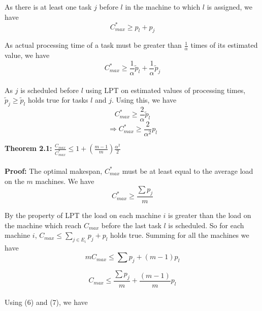 \documentclass[10pt, conference, compsocconf]{IEEEtran}
\begin{document}
As there is at least one task $j$ before $l$ in the machine to which $l$ is
assigned, we have
\begin{equation}\nonumber
C_{max}^{*}\geq p_l + p_j
\end{equation}



As actual processing time of a task must be greater than $\frac{1}{\alpha}$ times of its estimated value, we have
\begin{equation}\nonumber 
C_{max}^{*} \geq \frac{1}{\alpha}\tilde p_l +  \frac{1}{\alpha} \tilde p_j 
\end{equation}
\\
As $j$ is scheduled before $l$ using LPT on estimated values of processing times,  $\tilde p_j\geq   \tilde p_l$ holds true for tasks $l$ and $j$.  Using this, we have\\

\begin{equation}\nonumber
 C_{max}^{*} \geq \frac{2}{\alpha}\tilde p_l
 \end{equation}
\begin{equation}
\Rightarrow C_{max}^{*} \geq {\frac{2}{\alpha^{2}}} p_l  \end{equation}


\textbf{Theorem 2.1:} $\frac{C_{max}}{C_{max}^{*}} \leq 1 + (\frac{m-1}{m})\frac{\alpha^{2}}{2}$\\
\\
\textbf{Proof:} The optimal makespan, $C_{max}^{*}$ must be at least equal to the average load on the $m$ machines. We have\\
\begin{equation}
C_{max}^{*}\geq\frac{\sum p_j}{m}
\end{equation}

By the property of LPT the load on each machine $i$ is greater than the load on the machine which reach $C_{max}$ before the last task $l$ is scheduled. So for each machine $i$, $C_{max} \leq  \sum_{j \in E_i}^{}{p_j} + p_l$ holds true.  Summing for all the machines we have\\

\begin{equation}\nonumber 
mC_{max} \leq  \sum {p_j} + (m-1)p_l
\end{equation}

\begin{equation}
C_{max} \leq  \frac{\sum {p_j}}{m} + \frac{(m-1)}{m}p_l
\end{equation}
\\
Using (6) and (7), we have\\
\end{document}
